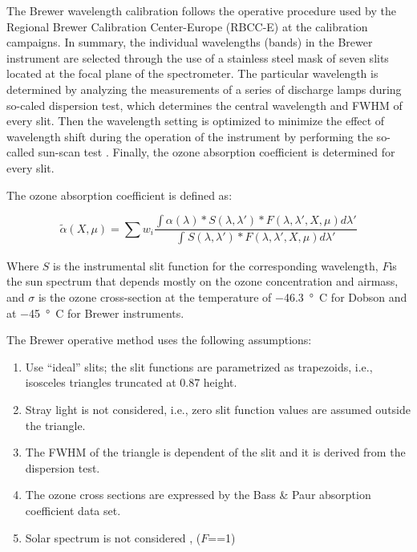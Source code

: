 \documentclass[acp, manuscript]{copernicus}
\begin{document}

The Brewer wavelength calibration follows the operative procedure \citep{Grobner1998, kerr2002new} used by the Regional Brewer Calibration Center-Europe (RBCC-E) at the calibration campaigns. In summary, the individual wavelengths (bands) in the Brewer instrument are selected through the use of a stainless steel mask of seven slits located at the focal plane of the spectrometer. The particular wavelength is determined by analyzing the measurements of  a series of discharge lamps during so-caled dispersion test, which determines the central wavelength and FWHM of every slit. Then the  wavelength setting is optimized to minimize the effect of wavelength shift during the operation of the instrument by performing the so-called sun-scan test \citep{sun_scan_ios}. Finally, the ozone absorption coefficient is determined for every slit.   


The  ozone absorption coefficient is defined as:

\begin{equation}
\widetilde \alpha (X,\mu ) = \sum {{w_i}} \frac{{\int {\alpha (\lambda )*S(\lambda ,\lambda ')*} F(\lambda ,\lambda ',X,\mu )d\lambda '}}{{\int_{}^{} {S(\lambda ,\lambda ')*F(\lambda ,\lambda ',X,\mu )d\lambda '} }}
\end{equation}

Where $S$ is the instrumental slit function for the corresponding wavelength, $F$is the sun spectrum that depends mostly on the ozone concentration and airmass, and $\sigma$ is the ozone cross-section at the temperature of $-$46.3\, \unit{\degree C} for Dobson 
and at $-$45\, \unit{\degree C} for Brewer instruments. 

The Brewer operative method uses the following assumptions:
\begin{enumerate}
	\item Use  “ideal” slits; the slit functions are parametrized as trapezoids, i.e., isosceles triangles truncated at 0.87 height.
	\item Stray light is not considered, i.e., zero slit function values are assumed outside the triangle. 
	\item The FWHM of the triangle is dependent of the slit and it is derived from the dispersion test.
	\item The ozone cross sections are expressed by the Bass \& Paur absorption coefficient data set.
 	\item Solar spectrum is not considered ,  ($F$==1)
\end{enumerate}
\end{document}
